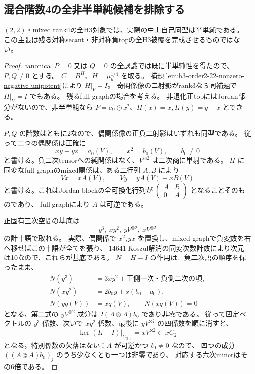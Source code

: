 \subsection{混合階数4の全非半単純候補を排除する}
\begin{theorem}\label{thm:h3-order2-22-rank4-all-Jordan-empty}
$(2,2)$・mixed rank4の全H3対象では、実際の中山自己同型は半単純である。
この主張は残る対称secant・非対称負topの全H3被覆を完成させるものではない。
\end{theorem}
\begin{proof}
canonical $P=0$ 又は $Q=0$ の全認識では既に半単純性を得たので、$P,Q\ne0$ とする。
$C=B^H$、$H=\mu_u^{1/4}$ を取る。
補題\ref{lem:h3-order2-22-nonzero-negative-unipotent}により $H|_V=I$。
奇関係像の二射影がrank3なら同補題で $H|_U=I$ でもある。
残るfull graphの場合を考える。
非退化正topにはJordan部分がないので、非半単純なら
$P=c_U\odot x^2$、$H(x)=x,H(y)=y+x$ とできる。

$P,Q$ の階数はともに2なので、偶関係像の正負二射影はいずれも同型である。
従って二つの偶関係は正確に
\[
 xy-yx=a_0(V),\qquad x^2=b_0(V),\qquad b_0\ne0
\]
と書ける。負二次tensorへの純関係はなく、$V^{\otimes2}$ は二次商に単射である。
$H$ に同変なfull graphのmixed関係は、ある二行列 $A,B$ により
\[
 Vx=xA(V),\qquad Vy=yA(V)+xB(V)
\]
と書ける。これはJordan blockの全可換化行列が
$\left(\begin{smallmatrix}A&B\\0&A\end{smallmatrix}\right)$ となることそのものであり、
full graphにより $A$ は可逆である。

正固有三次空間の基底は
\[
 y^3,\ xy^2,\ yV^{\otimes2},\ xV^{\otimes2}
\]
の計十語で取れる。
実際、偶関係で $x^2,yx$ を置換し、mixed graphで負変数を右へ移せばこの十語が全てを張り、
14641 Koszul解消の同変次数計数により次元は10なので、これらが基底である。
$N=H-I$ の作用は、負二次語の順序を保ったまま、
\[
\begin{aligned}
 N(y^3)&=3xy^2+\text{正側一次・負側二次の項},\\
 N(xy^2)&=2b_0y+x(b_0-a_0),\\
 N(yq(V))&=xq(V),\qquad N(xq(V))=0
\end{aligned}
\]
となる。第二式の $yV^{\otimes2}$ 成分は $2(A\otimes A)b_0$ であり非零である。
従って固定ベクトルの $y^3$ 係数、次いで $xy^2$ 係数、最後に $yV^{\otimes2}$ の四係数を順に消すと、
\[
 \ker(H-I)|_{C_{3,+}}=xV^{\otimes2}\subset xC_2
\]
となる。特別係数の欠落はない：$A$ が可逆かつ $b_0\ne0$ なので、
四つの成分 $((A\otimes A)b_0)_j$ のうち少なくとも一つは非零であり、
対応する六次minorはその6倍である。


\end{proof}
